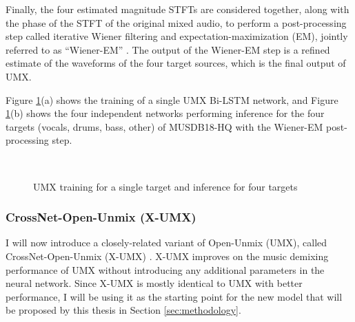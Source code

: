 \documentclass[report.tex]{subfiles}
\begin{document}
Finally, the four estimated magnitude STFTs are considered together, along with the phase of the STFT of the original mixed audio, to perform a post-processing step called iterative Wiener filtering and expectation-maximization (EM), jointly referred to as ``Wiener-EM'' \parencite{umxorig1, wiener2, wiener3, wiener4}. The output of the Wiener-EM step is a refined estimate of the waveforms of the four target sources, which is the final output of UMX.

Figure \ref{fig:umxes2}(a) shows the training of a single UMX Bi-LSTM network, and Figure \ref{fig:umxes2}(b) shows the four independent networks performing inference for the four targets (vocals, drums, bass, other) of MUSDB18-HQ with the Wiener-EM post-processing step.

\begin{figure}[ht]
	\centering
	\\
	\caption{UMX training for a single target and inference for four targets}
	\label{fig:umxes2}
\end{figure}


\subsubsection{CrossNet-Open-Unmix (X-UMX)}
\label{sec:xumx}

I will now introduce a closely-related variant of Open-Unmix (UMX), called CrossNet-Open-Unmix (X-UMX) \parencite{xumx}. X-UMX improves on the music demixing performance of UMX without introducing any additional parameters in the neural network. Since X-UMX is mostly identical to UMX with better performance, I will be using it as the starting point for the new model that will be proposed by this thesis in Section \ref{sec:methodology}.
\end{document}
